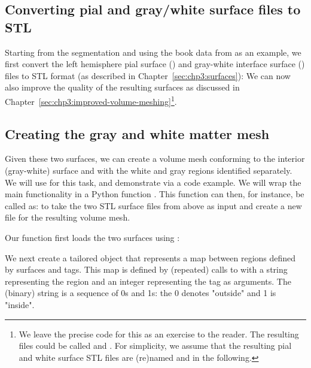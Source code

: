 \subsection{Converting pial and gray/white surface files to STL}

Starting from the \freesurfer{} segmentation and using the book data
from  as an example, we first convert the
left hemisphere pial surface () and gray-white interface
surface () files to STL format (as described in
Chapter~\ref{sec:chp3:surfaces}):
\noindent We can now also improve the quality of the resulting surfaces as
discussed in
Chapter~\ref{sec:chp3:improved-volume-meshing}\footnote{We leave the
  precise code for this as an exercise to the reader. The resulting
  files could be called  and
  . For simplicity, we assume that the
  resulting pial and white surface STL files are (re)named
   and  in the following.}.

\subsection{Creating the gray and white matter mesh}

Given these two surfaces, we can create a volume mesh conforming to
the interior (gray-white) surface and with the white and gray regions
identified separately. We will use \svmtk{} for this task, and
demonstrate via a \svmtk{} code example. We will wrap the main
functionality in a Python function
. This function can then, for instance,
be called as:
to take the two STL surface files from above as input and create a new
file  for the resulting volume mesh.

Our function first loads the two surfaces using \svmtk{}:

\noindent We next create a tailored \svmtk{}
 object that represents a map between
regions defined by surfaces and tags. This map is defined by
(repeated) calls to  with a string representing the
region and an integer representing the tag as arguments. The (binary)
string is a sequence of 0s and 1s: the 0 denotes "outside" and 1 is
"inside".

